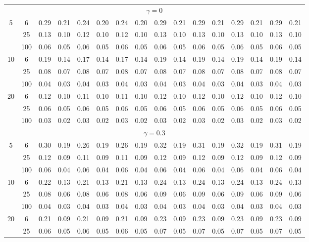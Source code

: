 \documentclass[
  man]{apa6}
\newenvironment{lltable}{\begin{landscape}\centering\begin{ThreePartTable}}{\end{ThreePartTable}\end{landscape}}
\begin{document}
\begin{lltable}
{\begin{longtable}{cccccccccccccccc}
\multicolumn{16}{c}{$\gamma = 0$}\\
5 & 6 & 0.29 & 0.21 & 0.24 & 0.20 & 0.24 & 0.20 & 0.29 & 0.21 & 0.29 & 0.21 & 0.29 & 0.21 & 0.29 & 0.21\\
 & 25 & 0.13 & 0.10 & 0.12 & 0.10 & 0.12 & 0.10 & 0.13 & 0.10 & 0.13 & 0.10 & 0.13 & 0.10 & 0.13 & 0.10\\
 & 100 & 0.06 & 0.05 & 0.06 & 0.05 & 0.06 & 0.05 & 0.06 & 0.05 & 0.06 & 0.05 & 0.06 & 0.05 & 0.06 & 0.05\\
10 & 6 & 0.19 & 0.14 & 0.17 & 0.14 & 0.17 & 0.14 & 0.19 & 0.14 & 0.19 & 0.14 & 0.19 & 0.14 & 0.19 & 0.14\\
 & 25 & 0.08 & 0.07 & 0.08 & 0.07 & 0.08 & 0.07 & 0.08 & 0.07 & 0.08 & 0.07 & 0.08 & 0.07 & 0.08 & 0.07\\
 & 100 & 0.04 & 0.03 & 0.04 & 0.03 & 0.04 & 0.03 & 0.04 & 0.03 & 0.04 & 0.03 & 0.04 & 0.03 & 0.04 & 0.03\\
20 & 6 & 0.12 & 0.10 & 0.11 & 0.10 & 0.11 & 0.10 & 0.12 & 0.10 & 0.12 & 0.10 & 0.12 & 0.10 & 0.12 & 0.10\\
 & 25 & 0.06 & 0.05 & 0.06 & 0.05 & 0.06 & 0.05 & 0.06 & 0.05 & 0.06 & 0.05 & 0.06 & 0.05 & 0.06 & 0.05\\
 & 100 & 0.03 & 0.02 & 0.03 & 0.02 & 0.03 & 0.02 & 0.03 & 0.02 & 0.03 & 0.02 & 0.03 & 0.02 & 0.03 & 0.02\\
\multicolumn{16}{c}{$\gamma = 0.3$}\\
5 & 6 & 0.30 & 0.19 & 0.26 & 0.19 & 0.26 & 0.19 & 0.32 & 0.19 & 0.31 & 0.19 & 0.32 & 0.19 & 0.31 & 0.19\\
 & 25 & 0.12 & 0.09 & 0.11 & 0.09 & 0.11 & 0.09 & 0.12 & 0.09 & 0.12 & 0.09 & 0.12 & 0.09 & 0.12 & 0.09\\
 & 100 & 0.06 & 0.04 & 0.06 & 0.04 & 0.06 & 0.04 & 0.06 & 0.04 & 0.06 & 0.04 & 0.06 & 0.04 & 0.06 & 0.04\\
10 & 6 & 0.22 & 0.13 & 0.21 & 0.13 & 0.21 & 0.13 & 0.24 & 0.13 & 0.24 & 0.13 & 0.24 & 0.13 & 0.24 & 0.13\\
 & 25 & 0.08 & 0.06 & 0.08 & 0.06 & 0.08 & 0.06 & 0.09 & 0.06 & 0.09 & 0.06 & 0.09 & 0.06 & 0.09 & 0.06\\
 & 100 & 0.04 & 0.03 & 0.04 & 0.03 & 0.04 & 0.03 & 0.04 & 0.03 & 0.04 & 0.03 & 0.04 & 0.03 & 0.04 & 0.03\\
20 & 6 & 0.21 & 0.09 & 0.21 & 0.09 & 0.21 & 0.09 & 0.23 & 0.09 & 0.23 & 0.09 & 0.23 & 0.09 & 0.23 & 0.09\\
 & 25 & 0.06 & 0.05 & 0.06 & 0.05 & 0.06 & 0.05 & 0.07 & 0.05 & 0.07 & 0.05 & 0.07 & 0.05 & 0.07 & 0.05\\

\end{longtable}}
\end{lltable}
\end{document}
